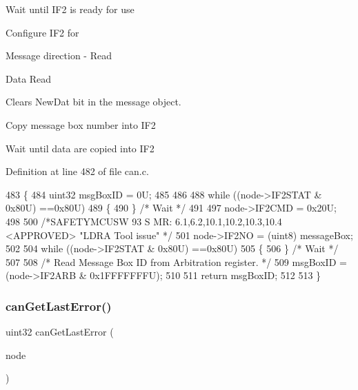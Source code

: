 \begin{DoxyItemize}
\item Wait until I\+F2 is ready for use ~\newline
~\newline
~\newline

\item Configure I\+F2 for
\begin{DoxyItemize}
\item Message direction -\/ Read
\item Data Read
\item Clears New\+Dat bit in the message object.
\end{DoxyItemize}
\item Copy message box number into I\+F2 ~\newline

\item Wait until data are copied into I\+F2 
\end{DoxyItemize}

Definition at line 482 of file can.\+c.


\begin{DoxyCode}
483 \{
484     uint32   msgBoxID  = 0U;
485 
486 
488     \textcolor{keywordflow}{while} ((node->IF2STAT & 0x80U) ==0x80U)
489     \{
490     \} \textcolor{comment}{/* Wait */}
491 
497     node->IF2CMD = 0x20U;
498 
500     \textcolor{comment}{/*SAFETYMCUSW 93 S MR: 6.1,6.2,10.1,10.2,10.3,10.4 <APPROVED> "LDRA Tool issue" */}
501     node->IF2NO = (uint8) messageBox;
502 
504     \textcolor{keywordflow}{while} ((node->IF2STAT & 0x80U) ==0x80U)
505     \{
506     \} \textcolor{comment}{/* Wait */}
507 
508     \textcolor{comment}{/* Read Message Box ID from Arbitration register. */}
509     msgBoxID = (node->IF2ARB & 0x1FFFFFFFU);
510 
511     \textcolor{keywordflow}{return} msgBoxID;
512 
513 \}
\end{DoxyCode}
\mbox{\label{group__CAN_ga1c340f76d9eb647dbc6d01db099b0431}} 
\subsubsection{\texorpdfstring{can\+Get\+Last\+Error()}{canGetLastError()}}
{\footnotesize\ttfamily uint32 can\+Get\+Last\+Error (\begin{DoxyParamCaption}\item[{\mbox{\hyperlink{reg__can_8h_a54ace0879c28a425474845a63d662c05}{can\+B\+A\+S\+E\+\_\+t}} $\ast$}]{node }\end{DoxyParamCaption})}



